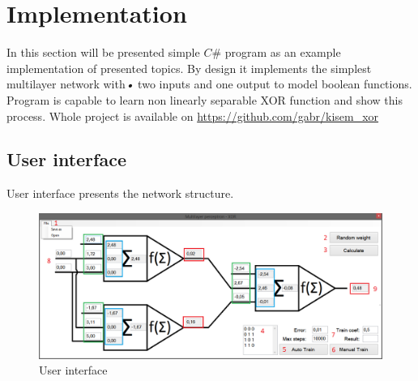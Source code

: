\section{Implementation}
\label{Implementation}

In this section will be presented simple $C\#$ program as an example implementation of presented topics.
By design it implements the simplest multilayer network with\textit{•} two inputs and one output to model boolean functions.
Program is capable to learn non linearly separable XOR function and show this process.
Whole project is available on \url{https://github.com/gabr/kisem_xor}
\subsection{User interface}
\label{UserInterface}

User interface presents the network structure.

\begin{figure}[!h]
    \centering
    \includegraphics[scale=0.45]{Media/UI_numbers.png}
    \caption{User interface}
    \label{fig:UInumbers}
\end{figure}

